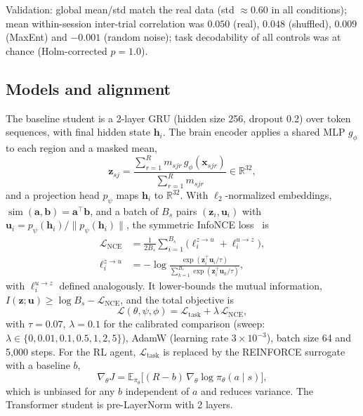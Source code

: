 \documentclass[conference]{IEEEtran}
\newcommand{\E}{\mathbb{E}}
\newcommand{\NCE}{\mathcal{L}_{\mathrm{NCE}}}
\newcommand{\Ltask}{\mathcal{L}_{\mathrm{task}}}
\begin{document}
Validation: global mean/std match the real data (std $\approx0.60$ in all conditions); mean
within-session inter-trial correlation was $0.050$ (real), $0.048$ (shuffled), $0.009$ (MaxEnt)
and $-0.001$ (random noise); task decodability of all controls was at chance (Holm-corrected
$p=1.0$).

\subsection{Models and alignment}
The baseline student is a 2-layer GRU (hidden size 256, dropout 0.2) over token sequences, with final hidden state $\mathbf h_i$.
The brain encoder applies a shared MLP $g_\phi$ to each region and a masked mean,
\begin{equation}
  \mathbf z_{sj}=\frac{\sum_{r=1}^{R}m_{sjr}\,g_\phi(\mathbf x_{sjr})}{\sum_{r=1}^{R}m_{sjr}}\in\mathbb R^{32},
\end{equation}
and a projection head $p_\psi$ maps $\mathbf h_i$ to $\mathbb R^{32}$. With $\ell_2$-normalized embeddings, $\operatorname{sim}(\mathbf a,\mathbf b)=\mathbf a^\top\mathbf b$, and a batch of $B_s$ pairs $(\mathbf z_i,\mathbf u_i)$ with $\mathbf u_i=p_\psi(\mathbf h_i)/\|p_\psi(\mathbf h_i)\|$, the symmetric InfoNCE loss~\cite{oord2018infonce} is
\begin{equation}
\begin{aligned}
  \NCE&=\tfrac{1}{2B_s}\sum_{i=1}^{B_s}\big(\ell_i^{z\to u}+\ell_i^{u\to z}\big),\\
  \ell_i^{z\to u}&=-\log\frac{\exp(\mathbf z_i^\top\mathbf u_i/\tau)}{\sum_{k=1}^{B_s}\exp(\mathbf z_i^\top\mathbf u_k/\tau)},
\end{aligned}
\end{equation}
with $\ell_i^{u\to z}$ defined analogously. It lower-bounds the mutual information, $I(\mathbf z;\mathbf u)\ge\log B_s-\NCE$, and the total objective is
\begin{equation}
  \mathcal L(\theta,\psi,\phi)=\Ltask+\lambda\,\NCE,
\end{equation}
with $\tau=0.07$, $\lambda=0.1$ for the calibrated comparison (sweep: $\lambda\in\{0,0.01,0.1,0.5,1,2,5\}$),
AdamW (learning rate $3\times10^{-3}$), batch size 64 and 5{,}000 steps. For the RL agent, $\Ltask$ is replaced by the REINFORCE surrogate with a baseline $b$,
\begin{equation}
  \nabla_\theta J=\E_{\pi_\theta}\!\big[(R-b)\,\nabla_\theta\log\pi_\theta(a\mid s)\big],
\end{equation}
which is unbiased for any $b$ independent of $a$ and reduces variance. The Transformer student is pre-LayerNorm with 2 layers.
\end{document}
